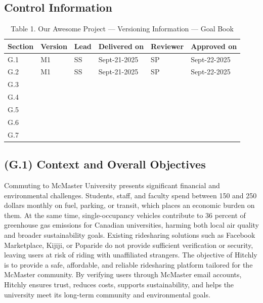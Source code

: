 \documentclass[12pt,letterpaper]{article}
\begin{document}
\subsection*{Control Information}
\begin{table}[h!]\centering
\caption*{Table 1. Our Awesome Project --- Versioning Information --- Goal Book}
\renewcommand{\arraystretch}{1.1}
\begin{tabularx}{\textwidth}{@{}l l l l l l@{}}
\toprule
\textbf{Section} & \textbf{Version} & \textbf{Lead} & \textbf{Delivered on} & \textbf{Reviewer} & \textbf{Approved on} \\
\midrule
G.1 & M1 & SS & Sept-21-2025 & SP & Sept-22-2025 \\
G.2 & M1 & SS & Sept-21-2025 & SP & Sept-22-2025 \\
G.3 & & & & & \\
G.4 & & & & & \\
G.5 & & & & & \\
G.6 & & & & & \\
G.7 & & & & & \\
\bottomrule
\end{tabularx}
\end{table}

\subsection{(G.1) Context and Overall Objectives}
Commuting to McMaster University presents significant financial and environmental challenges. Students, staff, and faculty spend between 150 and 250 dollars monthly on fuel, parking, or transit, which places an economic burden on them. At the same time, single-occupancy vehicles contribute to 36 percent of greenhouse gas emissions for Canadian universities, harming both local air quality and broader sustainability goals. Existing ridesharing solutions such as Facebook Marketplace, Kijiji, or Poparide do not provide sufficient verification or security, leaving users at risk of riding with unaffiliated strangers. The objective of Hitchly is to provide a safe, affordable, and reliable ridesharing platform tailored for the McMaster community. By verifying users through McMaster email accounts, Hitchly ensures trust, reduces costs, supports sustainability, and helps the university meet its long-term community and environmental goals. 
\end{document}
